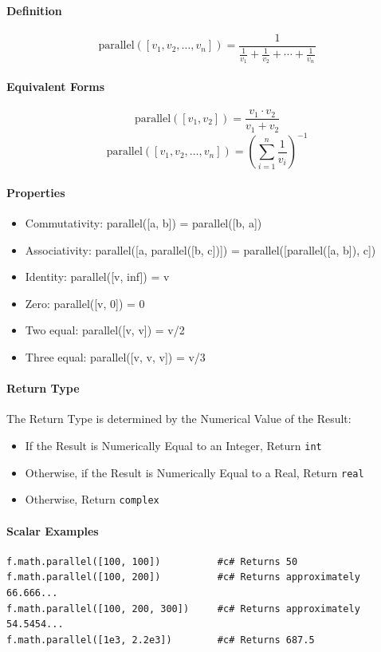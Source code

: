 \paragraph{Definition}
\[
\text{parallel}([v_1, v_2, \ldots, v_n]) = \frac{1}{\frac{1}{v_1} + \frac{1}{v_2} + \cdots + \frac{1}{v_n}}
\]

\paragraph{Equivalent Forms}
\[
\text{parallel}([v_1, v_2]) = \frac{v_1 \cdot v_2}{v_1 + v_2}
\]
\[
\text{parallel}([v_1, v_2, \ldots, v_n]) = \left(\sum_{i=1}^{n} \frac{1}{v_i}\right)^{-1}
\]

\paragraph{Properties}
\begin{itemize}
\item Commutativity: parallel([a, b]) = parallel([b, a])
\item Associativity: parallel([a, parallel([b, c])]) = parallel([parallel([a, b]), c])
\item Identity: parallel([v, inf]) = v
\item Zero: parallel([v, 0]) = 0
\item Two equal: parallel([v, v]) = v/2
\item Three equal: parallel([v, v, v]) = v/3
\end{itemize}

\paragraph{Return Type}
The Return Type is determined by the Numerical Value of the Result:
\begin{itemize}
\item If the Result is Numerically Equal to an Integer, Return \texttt{int}
\item Otherwise, if the Result is Numerically Equal to a Real, Return \texttt{real}
\item Otherwise, Return \texttt{complex}
\end{itemize}

\paragraph{Scalar Examples}
\begin{verbatim}
f.math.parallel([100, 100])          #c# Returns 50
f.math.parallel([100, 200])          #c# Returns approximately 66.666...
f.math.parallel([100, 200, 300])     #c# Returns approximately 54.5454...
f.math.parallel([1e3, 2.2e3])        #c# Returns 687.5
\end{verbatim}


